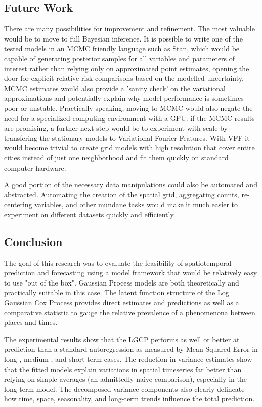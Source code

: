 \subsection{Future Work}

There are many possibilities for improvement and refinement. The most valuable would be to move to full Bayesian inference. It is possible to write one of the tested models in an MCMC friendly language such as Stan, which would be capable of generating posterior samples for all variables and parameters of interest rather than relying only on approximated point estimates, opening the door for explicit relative risk comparisons based on the modelled uncertainty. MCMC estimates would also provide a 'sanity check' on the variational approximations and potentially explain why model performance is sometimes poor or unstable. Practically speaking, moving to MCMC would also negate the need for a specialized computing environment with a GPU. if the MCMC results are promising, a further next step would be to experiment with scale by transfering the stationary models to Variational Fourier Features. With VFF it would become trivial to create grid models with high resolution that cover entire cities instead of just one neighborhood and fit them quickly on standard computer hardware.  \par


A good portion of the necessary data manipulations could also be automated and abstracted. Automating the creation of the spatial grid, aggregating counts, re-centering variables, and other mundane tasks would make it much easier to experiment on different datasets quickly and efficiently.


\subsection{Conclusion}

The goal of this research was to evaluate the feasibility of spatiotemporal prediction and forecasting using a model framework that would be relatively easy to use "out of the box". Gaussian Process models are both theoretically and practically suitable in this case. The latent function structure of the Log Gaussian Cox Process provides direct estimates and predictions as well as a comparative statistic to gauge the relative prevalence of a phenomenona between places and times. \par

The experimental results show that the LGCP performs as well or better at prediction than a standard autoregression as measured by Mean Squared Error in long-, medium-, and short-term cases. The reduction-in-variance estimates show that the fitted models explain variations in spatial timeseries far better than relying on simple averages (an admittedly naive comparison), especially in the long-term model. The decomposed variance components also clearly delineate how time, space, seasonality, and long-term trends influence the total prediction. \par

